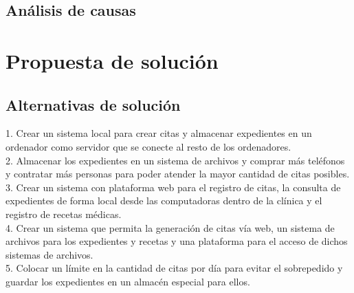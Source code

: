 \subsection{Análisis de causas}

\begin{center}
\end{center}

\section{Propuesta de solución}

\subsection{Alternativas de solución}

1. Crear un sistema local para crear citas y almacenar expedientes en un ordenador como servidor que se conecte al resto de los ordenadores. \\

2. Almacenar los expedientes en un sistema de archivos y comprar más teléfonos y contratar más personas para poder atender la mayor cantidad de citas posibles. \\

3. Crear un sistema con plataforma web para el registro de citas, la consulta de expedientes de forma local desde las computadoras dentro de la clínica y el registro de recetas médicas. \\

4. Crear un sistema que permita la generación de citas vía web, un sistema de archivos para los expedientes y recetas y una plataforma para el acceso de dichos sistemas de archivos. \\

5. Colocar un límite en la cantidad de citas por día para evitar el sobrepedido y guardar los expedientes en un almacén especial para ellos.
